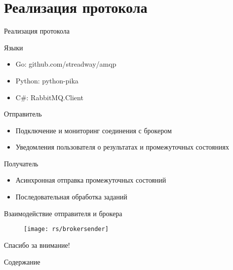 \documentclass[xetex,mathserif,serif,10pt]{beamer}
\newenvironment{sframe}[2]{\section{#1}\begin{frame}[label=#2]{#1}}{\end{frame}}
\begin{document}
    \begin{sframe}{Реализация протокола}{binddev}
        \begin{block}{Языки}
            \begin{itemize}
                \item Go: github.com/streadway/amqp
                \item Python: python-pika
                \item C\#: RabbitMQ.Client
            \end{itemize}
        \end{block}
        \begin{block}{Отправитель}
            \begin{itemize}
                \item Подключение и мониторинг соединения с брокером
                \item Уведомления пользователя о результатах и промежуточных
                    состояниях
            \end{itemize}
        \end{block}
        \begin{block}{Получатель}
            \begin{itemize}
                \item Асинхронная отправка промежуточных состояний
                \item Последовательная обработка заданий
            \end{itemize}
        \end{block}
    \end{sframe}

    \begin{frame}{Взаимодействие отправителя и брокера}
        \begin{figure}
            \centering
            \texttt{[image: rs/brokersender]}
        \end{figure}
    \end{frame}

    \begin{frame}
        \Large\centering Спасибо за внимание!
    \end{frame}

    \begin{frame}{Содержание}
        \tableofcontents
    \end{frame}
\end{document}
